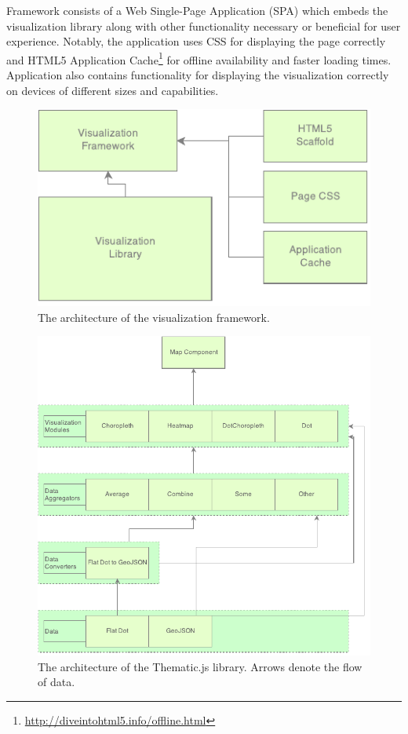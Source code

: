 Framework consists of a Web Single-Page Application (SPA) which embeds the visualization library along with other functionality necessary or beneficial for user experience. Notably, the application uses CSS for displaying the page correctly and HTML5 Application Cache\footnote{\url{http://diveintohtml5.info/offline.html}} for offline availability and faster loading times.  Application also contains functionality for displaying the visualization correctly on devices of different sizes and capabilities.

\begin{figure}[htbp]
  \centering
  \includegraphics[width=\textwidth]{images/framework-architecture.pdf}
  \caption{The architecture of the visualization framework.}
  \label{fig:framework_architecture}
\end{figure}


\begin{figure}[htbp]
  \centering
  \includegraphics[width=\textwidth]{images/library-architecture.pdf}
  \caption{The architecture of the Thematic.js library. Arrows denote the flow of data.}
  \label{fig:lib_architecture}
\end{figure}

